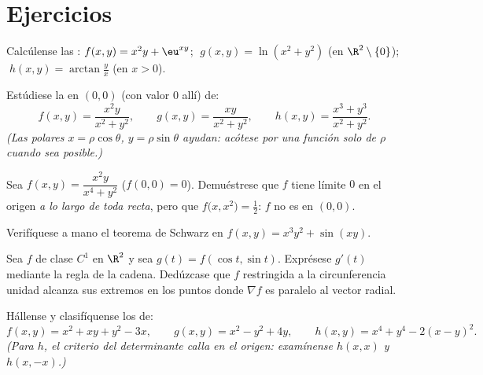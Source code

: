 \section{Ejercicios}

\begin{exercise}[$\star$]\label{exo:b1:multivar:1}
Calcúlense las :
$f(x,y) = x^2 y + \eu^{xy}$; $\;g(x,y) = \ln(x^2 + y^2)$ (en
$\R^2\setminus\{0\}$); $\;h(x,y) = \arctan\frac yx$ (en $x > 0$).
\end{exercise}

\begin{exercise}[$\star$]\label{exo:b1:multivar:2}
Estúdiese la  en $(0,0)$ (con valor $0$ allí) de:
\[
f(x,y) = \frac{x^2 y}{x^2 + y^2},
\qquad
g(x,y) = \frac{xy}{x^2 + y^2},
\qquad
h(x,y) = \frac{x^3 + y^3}{x^2 + y^2}.
\]
\emph{(Las  polares $x = \rho\cos\theta$, $y = \rho\sin\theta$
ayudan: acótese por una función solo de $\rho$ cuando sea posible.)}
\end{exercise}

\begin{exercise}[$\star\star$]\label{exo:b1:multivar:3}
Sea $f(x,y) = \dfrac{x^2 y}{x^4 + y^2}$ ($f(0,0) = 0$). Demuéstrese que
$f$ tiene límite $0$ en el origen \emph{a lo largo de toda recta},
pero que $f\bigl(x, x^2\bigr) = \frac12$: $f$ no es  en
$(0,0)$.
\end{exercise}

\begin{exercise}[$\star$]\label{exo:b1:multivar:4}
Verifíquese a mano el teorema de Schwarz en $f(x, y) = x^3 y^2 + \sin(xy)$.
\end{exercise}

\begin{exercise}[$\star\star$]\label{exo:b1:multivar:5}
Sea $f$ de clase $C^1$ en $\R^2$ y sea $g(t) = f(\cos t, \sin t)$. Exprésese
$g'(t)$ mediante la regla de la cadena. Dedúzcase que $f$ restringida a la
circunferencia unidad alcanza sus extremos en los puntos donde $\nabla f$ es
paralelo al vector radial.
\end{exercise}

\begin{exercise}[$\star\star$]\label{exo:b1:multivar:6}
Hállense y clasifíquense los  de:
\[
f(x, y) = x^2 + xy + y^2 - 3x,
\qquad
g(x, y) = x^2 - y^2 + 4y,
\qquad
h(x, y) = x^4 + y^4 - 2(x - y)^2 .
\]
\emph{(Para $h$, el criterio del determinante calla en el origen:
examínense $h(x, x)$ y $h(x, -x)$.)}
\end{exercise}

